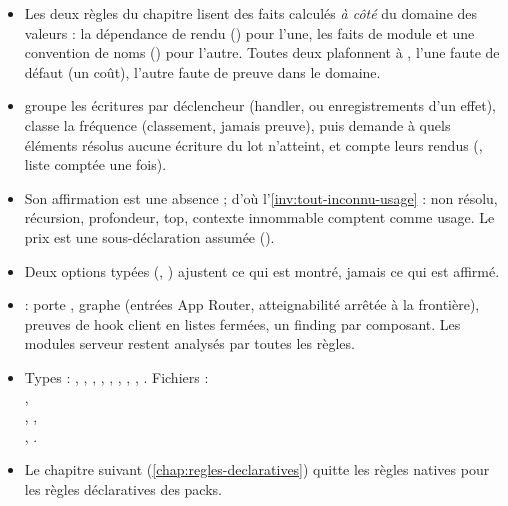 \begin{resume}
\begin{itemize}
  \item Les deux règles du chapitre lisent des faits calculés \emph{à côté} du domaine des
        valeurs : la dépendance de rendu () pour l'une, les faits de module et une
        convention de noms () pour l'autre. Toutes deux plafonnent à \Warning{}, l'une
        faute de défaut (un coût), l'autre faute de preuve dans le domaine.
  \item {} groupe les écritures par déclencheur (handler, ou
        enregistrements d'un effet), classe la fréquence (classement, jamais preuve), puis demande
        à  quels éléments résolus aucune écriture du lot
        n'atteint, et compte leurs rendus (, liste comptée une fois).
  \item Son affirmation est une absence ; d'où l'\cref{inv:tout-inconnu-usage} : non résolu,
        récursion, profondeur, top, contexte innommable comptent comme usage. Le prix est une
        sous-déclaration assumée ().
  \item Deux options typées (, ) ajustent ce qui est
        montré, jamais ce qui est affirmé.
  \item {} : porte , graphe
         (entrées App Router, atteignabilité arrêtée à la frontière), preuves
        de hook client en listes fermées, un finding par composant. Les modules serveur restent
        analysés par toutes les règles.
  \item Types : , , , ,
        , , , ,
        . Fichiers :\\
        ,\\
        , ,\\
        , .
  \item Le chapitre suivant (\cref{chap:regles-declaratives}) quitte les règles natives pour les
        règles déclaratives des packs.
\end{itemize}
\end{resume}

